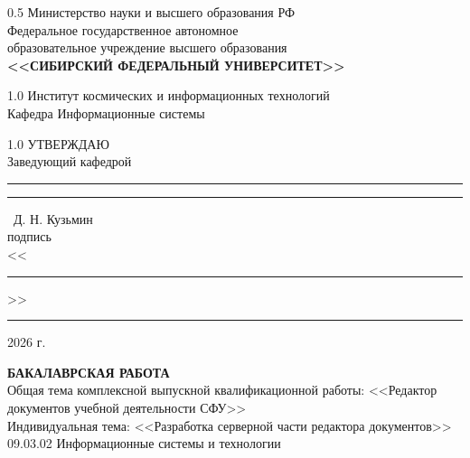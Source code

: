 \begin{titlepage}
	\begin{center}
		\begin{spacing}{0.5}
		Министерство науки и высшего образования  РФ\\
		{\small Федеральное государственное автономное}\\
		{\small образовательное учреждение высшего образования}\\
		\textbf{\small<<СИБИРСКИЙ ФЕДЕРАЛЬНЫЙ УНИВЕРСИТЕТ>>}\\
		\end{spacing}
		\vfill
		\begin{spacing}{1.0}
		Институт космических и информационных технологий\\
		Кафедра Информационные системы\\
		\end{spacing}
    \end{center}		
	\begin{minipage}[h]{0.45\linewidth}
	\hfil
	\end{minipage}
	\hspace{5mm}
	\begin{minipage}[h]{0.45\linewidth}
		\begin{spacing}{1.0}
			УТВЕРЖДАЮ\\
			Заведующий кафедрой\\[5mm]
			\rule{2cm}{.1pt} \rule{0.8cm}{0pt} ~Д. Н. Кузьмин\\
			{\small подпись}\\[5mm]
			<<\rule{1cm}{.1pt}>>\rule{2.5cm}{.1pt} 2026 г.
		\end{spacing}
	\end{minipage}
		
	\vspace{7mm}
	
	\vfill
	\begin{center}
		{
			{\fontsize{16pt}{14pt}\selectfont \textbf{БАКАЛАВРСКАЯ РАБОТА}}\\[7mm]
			Общая тема комплексной выпускной квалификационной работы: <<Редактор документов учебной деятельности СФУ>>\\
			Индивидуальная тема: <<Разработка серверной части редактора документов>>\\[3mm]
			09.03.02 Информационные системы и технологии\\[3mm]
		}
	\end{center}
	\vfill
	

\end{titlepage}
